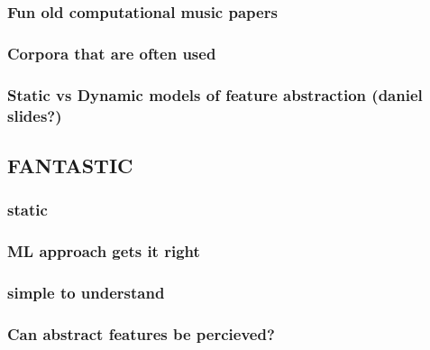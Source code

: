 \documentclass[]{book}
\theoremstyle{definition}
\theoremstyle{definition}
\theoremstyle{definition}
\theoremstyle{remark}
\begin{document}
\hypertarget{fun-old-computational-music-papers}{%
\subsubsection{Fun old computational music
papers}\label{fun-old-computational-music-papers}}

\hypertarget{corpora-that-are-often-used}{%
\subsubsection{Corpora that are often
used}\label{corpora-that-are-often-used}}

\hypertarget{static-vs-dynamic-models-of-feature-abstraction-daniel-slides}{%
\subsubsection{Static vs Dynamic models of feature abstraction (daniel
slides?)}\label{static-vs-dynamic-models-of-feature-abstraction-daniel-slides}}

\hypertarget{fantastic}{%
\subsection{FANTASTIC}\label{fantastic}}

\hypertarget{static}{%
\subsubsection{static}\label{static}}

\hypertarget{ml-approach-gets-it-right}{%
\subsubsection{ML approach gets it
right}\label{ml-approach-gets-it-right}}

\hypertarget{simple-to-understand}{%
\subsubsection{simple to understand}\label{simple-to-understand}}

\hypertarget{can-abstract-features-be-percieved}{%
\subsubsection{Can abstract features be
percieved?}\label{can-abstract-features-be-percieved}}
\end{document}
